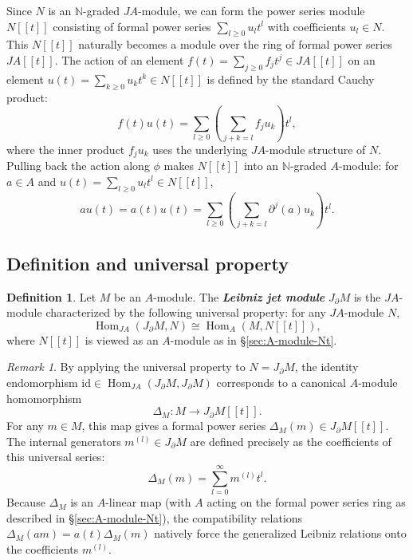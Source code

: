 \documentclass[a4paper, 12pt]{amsart}
\newcommand{\defterm}[1]{\textbf{\textit{#1}}\index{#1}}
\theoremstyle{definition}
\newtheorem{definition}[theorem]{Definition}
\theoremstyle{remark}
\newtheorem{remark}[theorem]{Remark}
\begin{document}
Since $N$ is an $\mathbb{N}$-graded $JA$-module, we can form the power series module $N[[t]]$ consisting of formal power series $\sum_{l \ge 0} u_l t^l$ with coefficients $u_l \in N$.
This $N[[t]]$ naturally becomes a module over the ring of formal power series $JA[[t]]$. 
The action of an element $f(t) = \sum_{j \ge 0} f_j t^j \in JA[[t]]$ on an element $u(t) = \sum_{k \ge 0} u_k t^k \in N[[t]]$ is defined by the standard Cauchy product:
\begin{equation*}
  f(t)u(t) = \sum_{l \ge 0} \left( \sum_{j + k = l} f_ju_k\right) t^l,
\end{equation*}
where the inner product $f_ju_k$ uses the underlying $JA$-module structure of $N$.
Pulling back the action along $\phi$ makes $N[[t]]$ into an $\mathbb{N}$-graded $A$-module:
for $a \in A$ and $u(t) = \sum_{l \ge 0} u_l t^l \in N[[t]]$,
\begin{equation*}
  au(t) = a(t)u(t) = \sum_{l \ge 0}\left(\sum_{j + k = l} \partial^j(a)u_k\right)t^l.
\end{equation*}

\subsection{Definition and universal property}
\label{sec:def-UP-Jd}

\begin{definition}
  \label{def:JdM}
  Let $M$ be an $A$-module.
  The \defterm{Leibniz jet module} $J_\partial M$ is the $JA$-module
  characterized by the following universal property:
  for any $JA$-module $N$,
  \begin{equation}
    \label{eq:UP-JdM}
    \operatorname{Hom}_{JA}(J_\partial M, N) \cong \operatorname{Hom}_A(M, N[[t]]),
  \end{equation}
  where $N[[t]]$ is viewed as an $A$-module as in \S\ref{sec:A-module-Nt}.
\end{definition}

\begin{remark}
  \label{rmk:universal-derivatives}
  By applying the universal property to $N = J_\partial M$, the identity endomorphism $\mathrm{id} \in \operatorname{Hom}_{JA}(J_\partial M, J_\partial M)$ corresponds to a canonical $A$-module homomorphism
  \begin{equation*}
    \Delta_M: M \to J_\partial M[[t]].
  \end{equation*}
  For any $m \in M$, this map gives a formal power series $\Delta_M(m) \in J_\partial M[[t]]$. The internal generators $m^{(l)} \in J_\partial M$ are defined precisely as the coefficients of this universal series:
  \begin{equation*}
    \Delta_M(m) = \sum_{l=0}^\infty m^{(l)} t^l.
  \end{equation*}
  Because $\Delta_M$ is an $A$-linear map (with $A$ acting on the formal power series ring as described in \S\ref{sec:A-module-Nt}), the compatibility relations $\Delta_M(am) = a(t)\Delta_M(m)$ natively force the generalized Leibniz relations onto the coefficients $m^{(l)}$.
\end{remark}
\end{document}
